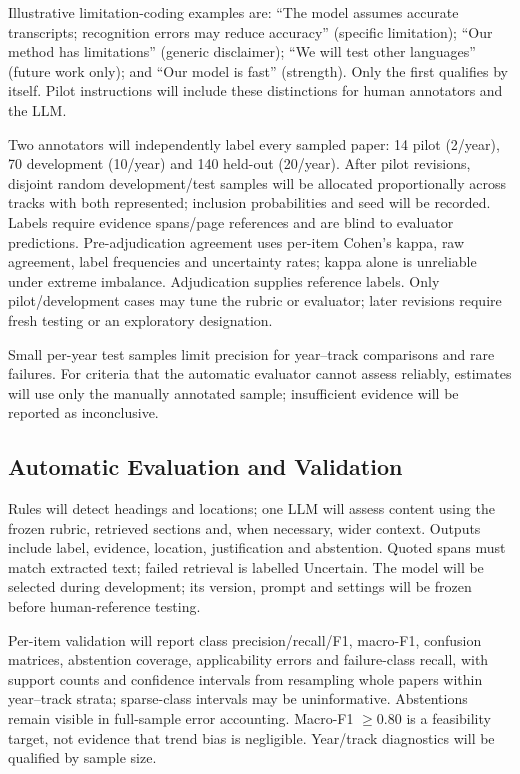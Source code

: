 \documentclass[11pt]{article}
\begin{document}
Illustrative limitation-coding examples are: ``The model assumes accurate transcripts; recognition errors may reduce accuracy'' (specific limitation); ``Our method has limitations'' (generic disclaimer); ``We will test other languages'' (future work only); and ``Our model is fast'' (strength). Only the first qualifies by itself. Pilot instructions will include these distinctions for human annotators and the LLM.

Two annotators will independently label every sampled paper: 14 pilot (2/year), 70 development (10/year) and 140 held-out (20/year). After pilot revisions, disjoint random development/test samples will be allocated proportionally across tracks with both represented; inclusion probabilities and seed will be recorded. Labels require evidence spans/page references and are blind to evaluator predictions. Pre-adjudication agreement uses per-item Cohen's kappa, raw agreement, label frequencies and uncertainty rates; kappa alone is unreliable under extreme imbalance. Adjudication supplies reference labels. Only pilot/development cases may tune the rubric or evaluator; later revisions require fresh testing or an exploratory designation.

Small per-year test samples limit precision for year--track comparisons and rare failures. For criteria that the automatic evaluator cannot assess reliably, estimates will use only the manually annotated sample; insufficient evidence will be reported as inconclusive.

\subsection{Automatic Evaluation and Validation}
Rules will detect headings and locations; one LLM will assess content using the frozen rubric, retrieved sections and, when necessary, wider context. Outputs include label, evidence, location, justification and abstention. Quoted spans must match extracted text; failed retrieval is labelled Uncertain. The model will be selected during development; its version, prompt and settings will be frozen before human-reference testing.

Per-item validation will report class precision/recall/F1, macro-F1, confusion matrices, abstention coverage, applicability errors and failure-class recall, with support counts and confidence intervals from resampling whole papers within year--track strata; sparse-class intervals may be uninformative. Abstentions remain visible in full-sample error accounting. Macro-F1 $\geq0.80$ is a feasibility target, not evidence that trend bias is negligible. Year/track diagnostics will be qualified by sample size.
\end{document}

